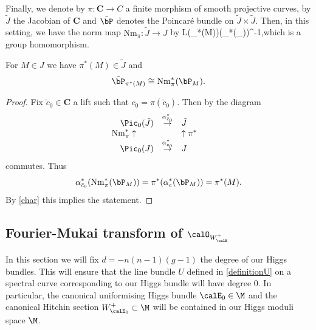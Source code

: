
Finally, we denote by $\pi:\mathbf{C}\to C$  a finite morphism of smooth projective curves, by  $\tilde{J}$  the Jacobian of $\mathbf{C}$ and  $\tilde{\bP}$ denotes the Poincar\'e bundle on $\tilde{J}\times \tilde{J}$. Then, in this setting,  we have the norm map ${\mathrm{Nm}}_\pi:\tilde{J}\to J$ by \beq \label{norm}L\mapsto \det(\pi_*(M))\otimes \det(\pi_*(\calO_{}))^{-1},\eeq which is a group homomorphism. %
\begin{lemma}
\notready \label{pullnorm} For $M\in J$ we have $\pi^*(M)\in \tilde{J}$ and $$\tilde{\bP}_{\pi^*(M)}\cong {\mathrm{Nm}}_{\pi}^*(\bP_M).$$
\end{lemma}
\begin{proof}  Fix $\tilde{c}_0\in \mathbf{C}$ a lift such that $c_0=\pi(\tilde{c}_0)$. Then by \cite[p. 331]{birkenhake-lange} the diagram $$\begin{array}{lcl} \Pic_0(\tilde{J}) &\stackrel{\alpha_{\tilde{c}_0}^*}{\rightarrow} & \tilde{J}\\  \!\!\!\!\!\!{{\mathrm{Nm}}}_{\pi}^*\uparrow && \uparrow  \pi^*\\ \Pic_0(J) &\stackrel{\alpha^*_{c_0}}{\rightarrow} & {J} \end{array}$$ commutes. Thus $$\alpha_{\tilde{c}_0}^*({\mathrm{Nm}}_{\pi}^*(\bP_M))=\pi^*(\alpha_c^*(\bP_M))=\pi^*(M).$$ By \eqref{char} this implies the statement.
\end{proof}


\subsection{Fourier-Mukai transform of $\calO_{W_\calE^+}$}

In this section we will fix $d=-n(n-1)(g-1)$ the degree of our Higgs bundles. This will ensure that the line bundle $U$ defined in \eqref{definitionU} on a spectral curve corresponding to our Higgs bundle will have degree $0$. In particular, the canonical uniformising Higgs bundle $\calE_0\in \M$ and the canonical Hitchin section $W^+_{\calE_0}\subset \M$ will be contained in our Higgs moduli space $\M$.

